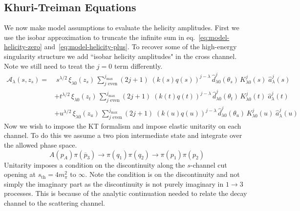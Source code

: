 \documentclass[10pt, aps,prd,amsmath,amssymb,superscriptaddress,onecolumn,
nofootinbib,showpacs,preprintnumbers]{revtex4-1}
\newcommand{\jmax}{{j_\text{max}}}
\begin{document}
\subsection{Khuri-Treiman Equations} \label{sec:unitarity}
We now make model assumptions to evaluate the helicity amplitudes. First we use the isobar approximation to truncate the infinite sum in eq.~\ref{eq:model-helicity-zero} and~\ref{eq:model-helicity-plus}. To recover some of the high-energy singularity structure we add ``isobar helicity amplitudes" in the cross channel. Note we still need to treat the \(j=0\) term differently.
%
  \begin{align}
    \label{eq:isobar}
    \mathcal{A}_\lambda(s,z_s) =& \;  s^{\lambda/2} \, \xi_{\lambda0}(z_s) \,
     \sum_{j \text{ even}}^{j_\text{max}} (2j+1) \; (k(s)q(s))^{j-\lambda} \, \hat{d}_{\lambda0}^j(\theta_s) \, K^j_{\lambda0}(s) \;\hat{a}^j_{\lambda}(s)
     \nonumber  \\
    &+  t^{\lambda/2} \, \xi_{\lambda0}(z_t) \,
     \sum_{j \text{ even}}^\jmax (2j+1) \; (k(t)q(t))^{j-\lambda} \, \hat{d}_{\lambda0}^j(\theta_t) \, K^j_{\lambda0}(t) \;\hat{a}^j_{\lambda}(t) \\
    &+  u^{\lambda/2} \, \xi_{\lambda0}(z_u) \,
     \sum_{j \text{ even}}^\jmax (2j+1) \;(k(u)q(u))^{j-\lambda} \, \hat{d}_{\lambda0}^j(\theta_u) \, K^j_{\lambda0}(u) \; \hat{a}^j_{\lambda}(u) \nonumber
  \end{align}
%
Now we wish to impose the KT formalism and impose elastic unitarity on each channel. To do this we assume a two pion intermediate state and integrate over the allowed phase space.
  \begin{equation}
    A(p_A) \pi(\overline{p}_3) \rightarrow \pi(q_1)\pi(q_2) \to \pi(p_1) \pi(p_2)
  \end{equation}
 Unitarity imposes a condition on the discontinuity along the \(s\)-channel cut opening at \(s_{\text{th}} = 4m_\pi^2\) to \(\infty\). Note the condition is on the discontinuity and not simply the imaginary part as the discontinuity is not purely imaginary in \(1 \to 3\) processes. This is because of the analytic continuation needed to relate the decay channel to the scattering channel.
\end{document}
